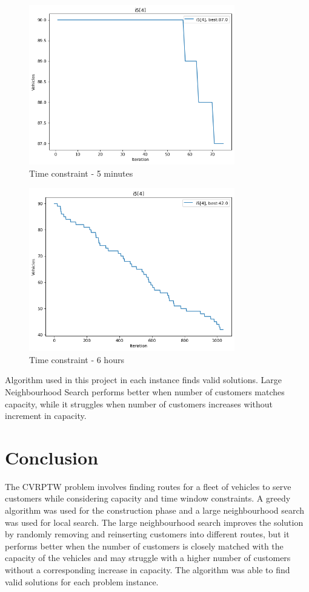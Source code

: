 \documentclass{article}
\begin{document}
\begin{figure}
\centering
\includegraphics[width=0.8\textwidth]{i5[4]_5_vehicles.png}
\caption{\label{fig:i5[4]_5_vehicles}Time constraint - 5 minutes}
\end{figure}

\begin{figure}
\centering
\includegraphics[width=0.8\textwidth]{i5[4]_360_vehicles.png}
\caption{\label{fig:i5[4]_360_vehicles}Time constraint - 6 hours}
\end{figure}

Algorithm used in this project in each instance finds valid solutions. Large Neighbourhood Search performs better when number of customers matches capacity, while it struggles when number of customers increases without increment in capacity.

\clearpage

\section{Conclusion}
The CVRPTW problem involves finding routes for a fleet of vehicles to serve customers while considering capacity and time window constraints. A greedy algorithm was used for the construction phase and a large neighbourhood search was used for local search. The large neighbourhood search improves the solution by randomly removing and reinserting customers into different routes, but it performs better when the number of customers is closely matched with the capacity of the vehicles and may struggle with a higher number of customers without a corresponding increase in capacity. The algorithm was able to find valid solutions for each problem instance.
\end{document}
